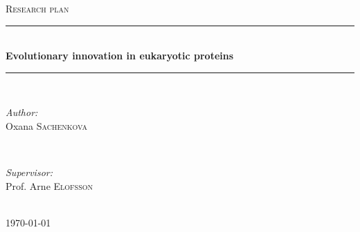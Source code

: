 \documentclass[11pt, a4paper,oneside]{report}
\begin{document}
\begin{titlepage}

\newcommand{\HRule}{\rule{\linewidth}{0.5mm}} %

\center %
 
 
\textsc{\Large Research plan}\\[0.5cm]  


\HRule \\[0.4cm]
{ \huge \bfseries Evolutionary innovation in eukaryotic proteins}\\[0.4cm] %
\HRule \\[1.5cm]
 

\begin{minipage}{0.4\textwidth}
\begin{flushleft} \large
\emph{Author:}\\
Oxana \textsc{Sachenkova}  
\end{flushleft}
\end{minipage}
~
\begin{minipage}{0.4\textwidth}
\begin{flushright} \large
\emph{Supervisor:} \\
Prof. Arne \textsc{Elofsson} %
\end{flushright}
\end{minipage}\\[4cm]

  

{\large \today}\\[3cm] %

 
\vfill %

\end{titlepage}
\end{document}
